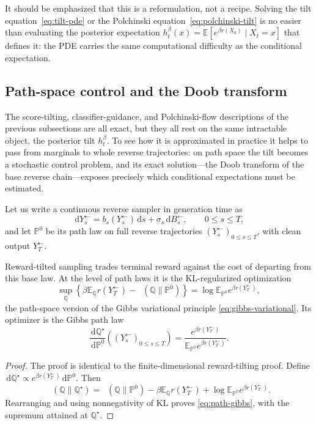 \documentclass[10pt,a4paper]{amsart}
\numberwithin{equation}{section}
\DeclareMathOperator{\KL}{D_{\mathsf{KL}}}
\newcommand{\E}{\mathbb{E}}
\newcommand{\Pp}{\mathbb{P}}
\newcommand{\dd}{\,\mathrm{d}}
\begin{document}
It should be emphasized that this is a reformulation, not a recipe.  Solving the
tilt equation~\eqref{eq:tilt-pde} or the Polchinski
equation~\eqref{eq:polchinski-tilt} is no easier than evaluating the posterior
expectation $h_t^\beta(x)=\E[e^{\beta r(X_0)}\mid X_t=x]$ that defines it: the PDE
carries the same computational difficulty as the conditional expectation.

\subsection{Path-space control and the Doob transform}

The score-tilting, classifier-guidance, and Polchinski-flow descriptions of the
previous subsections are all exact, but they all rest on the same intractable
object, the posterior tilt $h_t^\beta$.  To see how it is approximated in
practice it helps to pass from marginals to whole reverse trajectories: on path
space the tilt becomes a stochastic control problem, and its exact
solution---the Doob transform of the base reverse chain---exposes precisely which
conditional expectations must be estimated.

Let us write a continuous reverse sampler in generation time as
\[
    \dd Y^{\leftarrow}_s=b_s(Y^{\leftarrow}_s)\dd s+\sigma_s\dd B^{\leftarrow}_s,
    \qquad 0\leq s\leq T,
\]
and let $\Pp^0$ be its path law on full reverse trajectories
$(Y^{\leftarrow}_s)_{0\leq s\leq T}$, with clean output $Y^{\leftarrow}_T$.

Reward-tilted sampling trades terminal reward against the cost of departing from
this base law.  At the level of path laws it is the KL-regularized optimization
\begin{equation}\label{eq:path-gibbs}
    \sup_{\mathbb Q}
    \left\{
    \beta\E_{\mathbb Q}r(Y^{\leftarrow}_T)-\KL(\mathbb Q\|\Pp^0)
    \right\}
    =
    \log\E_{\Pp^0}e^{\beta r(Y^{\leftarrow}_T)},
\end{equation}
the path-space version of the Gibbs variational principle
\eqref{eq:gibbs-variational}.  Its optimizer is the Gibbs path law
\begin{equation}\label{eq:path-gibbs-optimizer}
    \frac{\dd\mathbb Q^\star}{\dd\Pp^0}
    \!\left((Y^{\leftarrow}_s)_{0\leq s\leq T}\right)
    =
    \frac{e^{\beta r(Y^{\leftarrow}_T)}}
    {\E_{\Pp^0}e^{\beta r(Y^{\leftarrow}_T)}}.
\end{equation}

\begin{proof}
The proof is identical to the finite-dimensional reward-tilting proof.  Define
$\dd\mathbb Q^\star\propto e^{\beta r(Y^{\leftarrow}_T)}\dd\Pp^0$.  Then
\[
    \KL(\mathbb Q\|\mathbb Q^\star)
    =
    \KL(\mathbb Q\|\Pp^0)-\beta \E_{\mathbb Q}r(Y^{\leftarrow}_T)
    +\log\E_{\Pp^0}e^{\beta r(Y^{\leftarrow}_T)}.
\]
Rearranging and using nonnegativity of KL proves \eqref{eq:path-gibbs}, with the
supremum attained at $\mathbb Q^\star$.
\end{proof}
\end{document}
